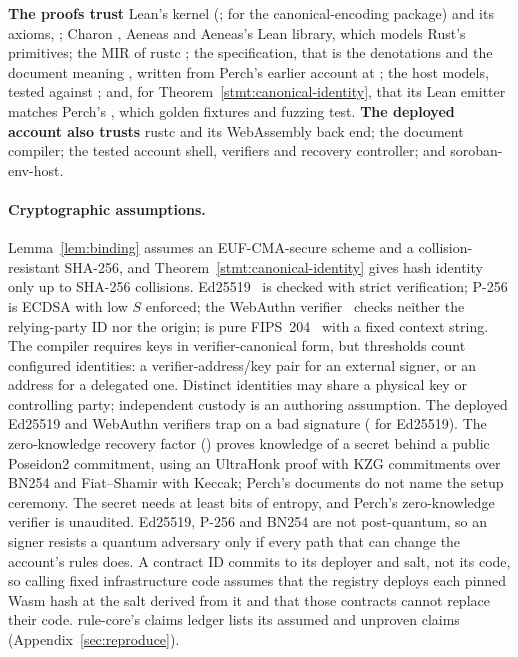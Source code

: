 \begin{perchbox}
\textbf{The proofs trust} Lean's kernel (;
 for the canonical-encoding package) and its axioms,
; Charon , Aeneas  and
Aeneas's Lean library, which models Rust's primitives; the MIR of rustc
; the specification, that is the denotations and the
document meaning , written from Perch's earlier account at
; the host models, tested against
; and, for
Theorem~\ref{stmt:canonical-identity}, that its Lean emitter matches Perch's
, which golden fixtures and fuzzing test. \textbf{The deployed
account also trusts} rustc  and its WebAssembly back end; the
document compiler; the tested account shell, verifiers and recovery controller;
and soroban-env-host.
\end{perchbox}

\paragraph{Cryptographic assumptions.} Lemma~\ref{lem:binding} assumes an
EUF-CMA-secure scheme and a collision-resistant SHA-256, and
Theorem~\ref{stmt:canonical-identity} gives hash identity only up to SHA-256
collisions. Ed25519~\cite{rfc8032} is checked with strict verification; P-256 is
ECDSA with low $S$ enforced; the WebAuthn verifier~\cite{webauthn2} checks
neither the relying-party ID nor the origin;  is pure
FIPS~204~\cite{fips204} with a fixed context string. The compiler requires keys
in verifier-canonical form, but thresholds count configured identities: a
verifier-address/key pair for an external signer, or an address for a delegated
one. Distinct identities may share a physical key or controlling party;
independent custody is an authoring assumption.
The deployed Ed25519 and WebAuthn verifiers trap on a bad signature
( for Ed25519). The zero-knowledge recovery factor
() proves knowledge of a secret behind a public Poseidon2
commitment, using an UltraHonk proof with KZG commitments over BN254 and
Fiat--Shamir with Keccak; Perch's documents do not name the setup ceremony. The
secret needs at least  bits of entropy, and Perch's
zero-knowledge verifier is unaudited. Ed25519, P-256 and BN254 are not
post-quantum, so an  signer resists a quantum adversary only
if every path that can change the account's rules does. A contract ID commits to
its deployer and salt, not its code, so calling fixed infrastructure code assumes
that the registry deploys each pinned Wasm hash at the salt derived from it and
that those contracts cannot replace their code. rule-core's claims ledger lists
its  assumed and  unproven claims
(Appendix~\ref{sec:reproduce}).
